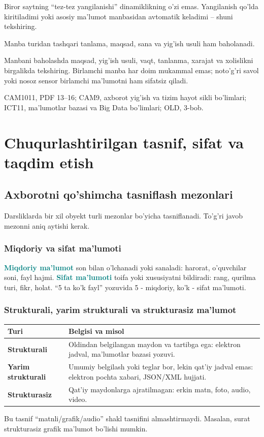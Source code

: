 \documentclass[11pt,a4paper,oneside]{book}
\newcommand{\term}[1]{\textbf{\textcolor{Teal}{#1}}\index{#1}}
\begin{document}
\begin{attest}
Biror saytning ``tez-tez yangilanishi'' dinamiklikning o'zi emas. Yangilanish qo'lda kiritiladimi yoki asosiy ma'lumot manbasidan avtomatik keladimi -- shuni tekshiring.
\end{attest}

\begin{attest}Manba turidan tashqari tanlama, maqsad, sana va yig'ish usuli ham baholanadi.\end{attest}

\begin{summarybox}
Manbani baholashda maqsad, yig'ish usuli, vaqt, tanlanma, xarajat va xolislikni birgalikda tekshiring. Birlamchi manba har doim mukammal emas; noto'g'ri savol yoki nosoz sensor birlamchi ma'lumotni ham sifatsiz qiladi.
\end{summarybox}
\begin{sourcebox}
CAM1011, PDF 13--16; CAM9, axborot yig'ish va tizim hayot sikli bo'limlari; ICT11, ma'lumotlar bazasi va Big Data bo'limlari; OLD, 3-bob.
\end{sourcebox}
\section{Chuqurlashtirilgan tasnif, sifat va taqdim etish}
\subsection{Axborotni qo'shimcha tasniflash mezonlari}
Darsliklarda bir xil obyekt turli mezonlar bo'yicha tasniflanadi. To'g'ri javob mezonni aniq aytishi kerak.

\subsubsection{Miqdoriy va sifat ma'lumoti}
\term{Miqdoriy ma'lumot} son bilan o'lchanadi yoki sanaladi: harorat, o'quvchilar soni, fayl hajmi. \term{Sifat ma'lumoti} toifa yoki xususiyatni bildiradi: rang, qurilma turi, fikr, holat. “5 ta ko'k fayl” yozuvida 5 - miqdoriy, ko'k - sifat ma'lumoti.

\subsubsection{Strukturali, yarim strukturali va strukturasiz ma'lumot}
\begin{tabularx}{\textwidth}{>{\sffamily\bfseries}p{}X}
\toprule
Turi & Belgisi va misol\\
\midrule
Strukturali & Oldindan belgilangan maydon va tartibga ega: elektron jadval, ma'lumotlar bazasi yozuvi.\\
Yarim strukturali & Umumiy belgilash yoki teglar bor, lekin qat'iy jadval emas: elektron pochta xabari, JSON/XML hujjati.\\
Strukturasiz & Qat'iy maydonlarga ajratilmagan: erkin matn, foto, audio, video.\\
\bottomrule
\end{tabularx}
Bu tasnif “matnli/grafik/audio” shakl tasnifini almashtirmaydi. Masalan, surat strukturasiz grafik ma'lumot bo'lishi mumkin.
\end{document}
